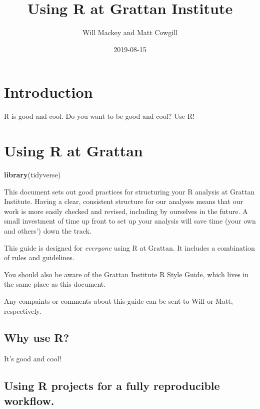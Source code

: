 \documentclass[]{book}
\title{Using R at Grattan Institute}
\author{Will Mackey and Matt Cowgill}
\date{2019-08-15}
\newenvironment{Shaded}{\begin{snugshade}}{\end{snugshade}}
\newcommand{\KeywordTok}[1]{\textcolor[rgb]{0.13,0.29,0.53}{\textbf{#1}}}
\newcommand{\NormalTok}[1]{#1}
\begin{document}
\maketitle

{
\setcounter{tocdepth}{1}
\tableofcontents
}
\hypertarget{introduction}{%
\chapter*{Introduction}\label{introduction}}

R is good and cool. Do you want to be good and cool? Use R!

\hypertarget{intro}{%
\chapter{Using R at Grattan}\label{intro}}

\begin{Shaded}
\begin{Highlighting}[]
\KeywordTok{library}\NormalTok{(tidyverse)}
\end{Highlighting}
\end{Shaded}

This document sets out good practices for structuring your R analysis at Grattan Institute. Having a clear, consistent structure for our analyses means that our work is more easily checked and revised, including by ourselves in the future. A small investment of time up front to set up your analysis will save time (your own and others') down the track.

This guide is designed for \emph{everyone} using R at Grattan. It includes a combination of rules and guidelines.

You should also be aware of the Grattan Institute R Style Guide, which lives in the same place as this document.

Any compaints or comments about this guide can be sent to Will or Matt, respectively.

\hypertarget{why-use-r}{%
\section{Why use R?}\label{why-use-r}}

It's good and cool!

\hypertarget{using-r-projects-for-a-fully-reproducible-workflow.}{%
\section{Using R projects for a fully reproducible workflow.}\label{using-r-projects-for-a-fully-reproducible-workflow.}}
\end{document}

